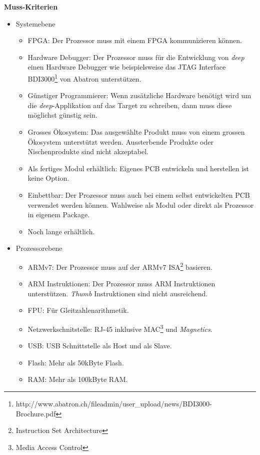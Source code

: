 \textbf{Muss-Kriterien}
\begin{itemize}
\item Systemebene
	\begin{itemize}
	\item FPGA: Der Prozessor muss mit einem FPGA kommunizieren können.
	\item Hardware Debugger: Der Prozessor muss für die Entwicklung von \textit{deep} einen Hardware Debugger wie beispielsweise das JTAG Interface BDI3000\footnote{http://www.abatron.ch/fileadmin/user\_upload/news/BDI3000-Brochure.pdf} von Abatron unterstützen. 
	\item Günstiger Programmierer: Wenn zusätzliche Hardware benötigt wird um die \textit{deep}-Applikation auf das Target zu schreiben, dann muss diese möglichst günstig sein.
	\item Grosses Ökosystem: Das ausgewählte Produkt muss von einem grossen Ökosystem unterstützt werden. Aussterbende Produkte oder Nischenprodukte sind nicht akzeptabel.
	\item Als fertiges Modul erhältlich: Eigenes PCB entwickeln und herstellen ist keine Option.
	\item Einbettbar: Der Prozessor muss auch bei einem selbst entwickelten PCB verwendet werden können. Wahlweise als Modul oder direkt als Prozessor in eigenem Package.
	\item Noch lange erhältlich.
	\end{itemize}
\item Prozessorebene
	\begin{itemize}
	\item ARMv7: Der Prozessor muss auf der ARMv7 ISA\footnote{Instruction Set Architecture} basieren.
	\item ARM Instruktionen: Der Prozessor muss ARM Instruktionen unterstützen. \textit{Thumb} Instruktionen sind nicht ausreichend.
	\item FPU: Für Gleitzahlenarithmetik.
	\item Netzwerkschnitstelle: RJ-45 inklusive MAC\footnote{Media Access Control} und \textit{Magnetics}.
	\item USB: USB Schnittstelle als Host und als Slave.
	\item Flash: Mehr als 50kByte Flash.
	\item RAM: Mehr als 100kByte RAM.
	\end{itemize}
\end{itemize}


